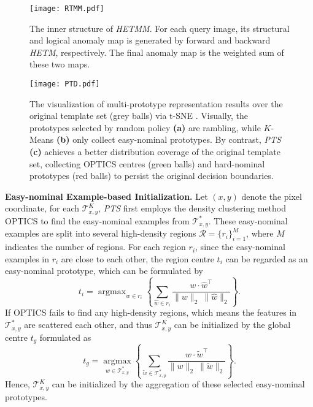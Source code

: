 \documentclass[default,iicol]{sn-jnl}\usepackage[algo2e,ruled,linesnumbered]{algorithm2e}
\theoremstyle{thmstyleone}\newtheorem{theorem}{Theorem}\newtheorem{proposition}[theorem]{Proposition}
\theoremstyle{thmstyletwo}\newtheorem{example}{Example}\newtheorem{remark}{Remark}
\theoremstyle{thmstylethree}\newtheorem{definition}{Definition}
\begin{document}
\begin{figure}[!t]
    \centering
    \texttt{[image: RTMM.pdf]}
    \caption{
        The inner structure of \textit{HETMM}.
        For each query image, its structural and logical anomaly map is generated by forward and backward \textit{HETM}, respectively.
        The final anomaly map is the weighted sum of these two maps.
    }
    \label{fig:RTMM}
\end{figure}

\begin{figure*}[!t]
    \centering
    \texttt{[image: PTD.pdf]}
    \caption{
    The visualization of multi-prototype representation results over the original template set (grey balls) via t-SNE \cite{tsne}.
    Visually, the prototypes selected by random policy \textbf{(a)} are rambling, while $K$-Means \textbf{(b)} only collect easy-nominal prototypes.
    By contrast, \textit{PTS} \textbf{(c)} achieves a better distribution coverage of the original template set, collecting OPTICS \cite{OPTICS} centres (green balls) and hard-nominal prototypes (red balls) to persist the original decision boundaries.
    }
    \label{fig:PTD}
\end{figure*}

\noindent\textbf{Easy-nominal Example-based Initialization. }
Let $(x, y)$ denote the pixel coordinate, for each $\mathcal{T}^{K}_{x,y}$, \textit{PTS} first employs the density clustering method OPTICS \cite{OPTICS} to find the easy-nominal examples from $\mathcal{T}^{*}_{x, y}$.
These easy-nominal examples are split into several high-density regions $\mathcal{R}=\{r_{i}\}_{i=1}^{M}$, where $M$ indicates the number of regions.
For each region $r_{i}$, since the easy-nominal examples in $r_{i}$ are close to each other, the region centre $t_{i}$ can be regarded as an easy-nominal prototype, which can be formulated by
\begin{equation}
    t_{i} = \mathop{\arg\max}_{w\in r_{i}}\left\{\sum_{\hat{w}\in r_{i}}\frac{w\cdot\hat{w}^{\top}}{\|w\|_{2}\ \|\hat{w}\|_{2}}\right\}.
    \label{eq:optics}
\end{equation}
If OPTICS fails to find any high-density regions, which means the features in $\mathcal{T}^{*}_{x, y}$ are scattered each other, and thus $\mathcal{T}^{K}_{x,y}$ can be initialized by the global centre $t_{g}$ formulated as
\begin{equation}
    t_{g} = \mathop{\arg\max}\limits_{w\in\mathcal{T}^{*}_{x,y}}\left\{\sum\limits_{\tilde{w}\in\mathcal{T}^{*}_{x,y}}\frac{w\cdot\tilde{w}^{\top}}{\|w\|_{2}\ \|\tilde{w}\|_{2}}\right\}.
    \label{eq:gcnt}
\end{equation}
Hence, $\mathcal{T}^{K}_{x,y}$ can be initialized by the aggregation of these selected easy-nominal prototypes.
\end{document}
